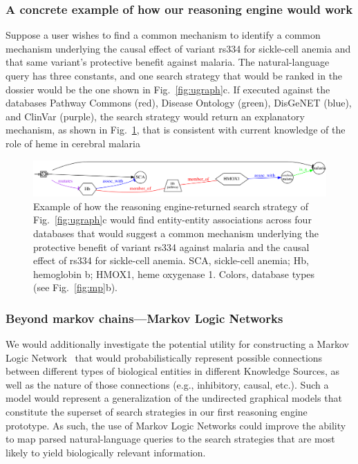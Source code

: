 \documentclass[11pt,notitlepage]{article}
\begin{document}
\subsubsection{A concrete example of how our reasoning engine would work}
Suppose a user wishes to find a common mechanism to identify a common
mechanism underlying the causal effect of variant rs334 for sickle-cell anemia
and that same variant's protective benefit against malaria. The natural-language
query has three constants, and one search strategy that would be ranked in the dossier
would be the one shown in Fig.~\ref{fig:ugraph}c. If executed against the databases
Pathway Commons (red), Disease Ontology (green), DisGeNET (blue), and ClinVar (purple),
the search strategy would return an explanatory mechanism, as shown in Fig.~\ref{fig:malaria},
that is consistent with current knowledge of the role of heme in cerebral malaria~\cite{Ferreira:2011ff}
\begin{figure}[h!]
     \includegraphics[width=6in]{net5.png} 
     \caption{Example of how the reasoning engine-returned search strategy of
       Fig.~\ref{fig:ugraph}c would find entity-entity associations across four
       databases that would suggest a common mechanism underlying the
       protective benefit of variant rs334 against malaria and the causal effect
       of rs334 for sickle-cell anemia. SCA, sickle-cell anemia; Hb,
       hemoglobin b; HMOX1, heme oxygenase 1.  Colors, database
       types (see Fig.~\ref{fig:mp}b).}
  \label{fig:malaria}
\end{figure}

\subsubsection{Beyond markov chains---Markov Logic Networks}
We would additionally investigate the potential utility for constructing a
Markov Logic Network~\cite{Domingos:2012wi,domingos20071} that would
probabilistically represent possible connections between different types of
biological entities in different Knowledge Sources, as well as the nature of
those connections (e.g., inhibitory, causal, etc.). Such a model would represent
a generalization of the undirected graphical models that constitute the superset
of search strategies in our first reasoning engine prototype. As such, the use
of Markov Logic Networks could improve the ability to map parsed
natural-language queries to the search strategies that are most likely to yield
biologically relevant information.
\end{document}
